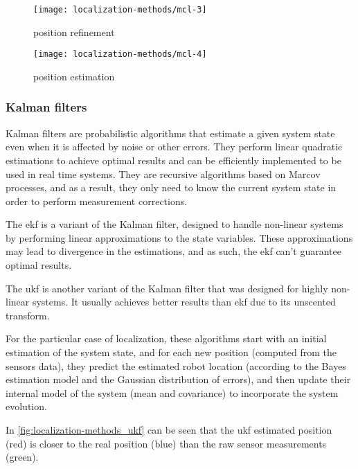 \begin{figure}[H]
	\centering
	\begin{minipage}[h]{.49\textwidth}
		\centering
		\texttt{[image: localization-methods/mcl-3]}
		\caption{ position refinement}
		\label{fig:localization-methods_mcl3}
	\end{minipage}\hfill
	\begin{minipage}[h]{.49\textwidth}
		\centering
		\texttt{[image: localization-methods/mcl-4]}
		\caption{ position estimation}
		\label{fig:localization-methods_mcl4}
	\end{minipage}
\end{figure}


\subsubsection{Kalman filters}

Kalman filters \cite{Kalman1960} are probabilistic algorithms that estimate a given system state even when it is affected by noise or other errors. They perform linear quadratic estimations to achieve optimal results and can be efficiently implemented to be used in real time systems. They are recursive algorithms based on Marcov processes, and as a result, they only need to know the current system state in order to perform measurement corrections.

The \gls{ekf} \cite{Einicke1999,Ribeiro2004,Ivanjko2010,Liu2011} is a variant of the Kalman filter, designed to handle non-linear systems by performing linear approximations to the state variables. These approximations may lead to divergence in the estimations, and as such, the \gls{ekf} can't guarantee optimal results.

The \gls{ukf} \cite{Julier1997,Wan2002} is another variant of the Kalman filter that was designed for highly non-linear systems. It usually achieves better results than \gls{ekf} due to its unscented transform.

For the particular case of localization, these algorithms start with an initial estimation of the system state, and for each new position (computed from the sensors data), they predict the estimated robot location (according to the Bayes estimation model and the Gaussian distribution of errors), and then update their internal model of the system (mean and covariance) to incorporate the system evolution.

In \cref{fig:localization-methods_ukf} can be seen that the \gls{ukf} estimated position (red) is closer to the real position (blue) than the raw sensor measurements (green).

